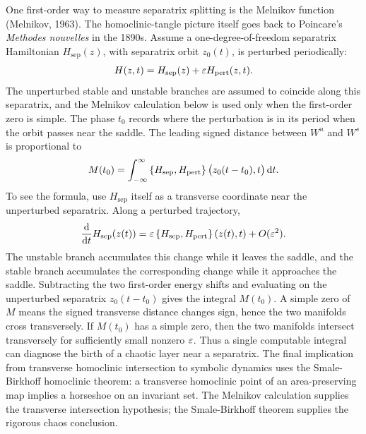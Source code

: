 One first-order way to measure separatrix splitting is the Melnikov function
(Melnikov, 1963). The homoclinic-tangle picture itself goes back to Poincare's
\emph{Methodes nouvelles} in the 1890s.
Assume a one-degree-of-freedom separatrix Hamiltonian \(H_{\mathrm{sep}}(z)\),
with separatrix orbit \(z_0(t)\), is perturbed periodically:
\[
  H(z,t)=H_{\mathrm{sep}}(z)+\varepsilon H_{\mathrm{pert}}(z,t).
\]
The unperturbed stable and unstable branches are assumed to coincide along this
separatrix, and the Melnikov calculation below is used only when the first-order
zero is simple.
The phase \(t_0\) records where the perturbation is in its period when the
orbit passes near the saddle. The leading signed distance between \(W^u\) and
\(W^s\) is proportional to
\[
  M(t_0)
  =
  \int_{-\infty}^{\infty}
  \left\{H_{\mathrm{sep}},H_{\mathrm{pert}}\right\}
  \bigl(z_0(t-t_0),t\bigr)\,\mathrm{d} t .
\]
To see the formula, use \(H_{\mathrm{sep}}\) itself as a transverse coordinate
near the unperturbed separatrix. Along a perturbed trajectory,
\[
  \frac{\mathrm{d}}{\mathrm{d} t}H_{\mathrm{sep}}(z(t))
  =
  \varepsilon\left\{H_{\mathrm{sep}},H_{\mathrm{pert}}\right\}(z(t),t)
  +O(\varepsilon^2).
\]
The unstable branch accumulates this change while it leaves the saddle, and the
stable branch accumulates the corresponding change while it approaches the
saddle. Subtracting the two first-order energy shifts and evaluating on the
unperturbed separatrix \(z_0(t-t_0)\) gives the integral \(M(t_0)\). A simple
zero of \(M\) means the signed transverse distance changes sign, hence the
two manifolds cross transversely.
If \(M(t_0)\) has a simple zero, then the two manifolds intersect
transversely for sufficiently small nonzero \(\varepsilon\). Thus a single computable
integral can diagnose the birth of a chaotic layer near a separatrix.
The final implication from transverse homoclinic intersection to symbolic
dynamics uses the Smale-Birkhoff homoclinic theorem: a transverse homoclinic
point of an area-preserving map implies a horseshoe on an invariant set. The
Melnikov calculation supplies the transverse intersection hypothesis; the
Smale-Birkhoff theorem supplies the rigorous chaos conclusion.

